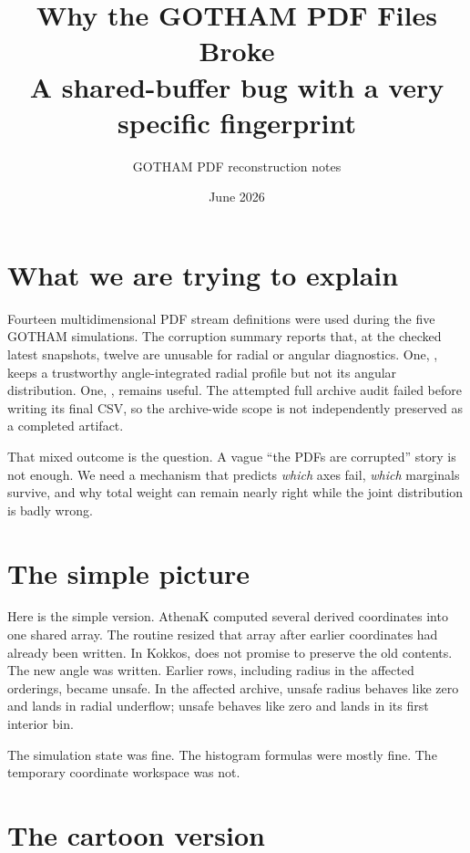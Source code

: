 \documentclass[11pt]{article}
\title{Why the GOTHAM PDF Files Broke\\\large A shared-buffer bug with a very specific fingerprint}
\author{GOTHAM PDF reconstruction notes}
\date{June 2026}
\begin{document}
\maketitle


\section{What we are trying to explain}

Fourteen multidimensional PDF stream definitions were used during the five
GOTHAM simulations. The corruption summary reports that, at the checked latest
snapshots, twelve are unusable for radial or angular diagnostics. One,
, keeps a trustworthy angle-integrated radial profile but
not its angular distribution. One, , remains useful. The
attempted full archive audit failed before writing its final CSV, so the
archive-wide scope is not independently preserved as a completed artifact.

That mixed outcome is the question. A vague ``the PDFs are corrupted'' story
is not enough. We need a mechanism that predicts \emph{which} axes fail,
\emph{which} marginals survive, and why total weight can remain nearly right
while the joint distribution is badly wrong.

\section{The simple picture}

Here is the simple version. AthenaK computed several derived coordinates into
one shared array. The  routine resized that array
after earlier coordinates had already been written. In Kokkos,
 does not promise to preserve the old contents. The new angle
was written. Earlier rows, including radius in the affected orderings, became
unsafe. In the affected archive, unsafe radius behaves like zero and lands in
radial underflow; unsafe  behaves like zero and
lands in its first interior bin.

The simulation state was fine. The histogram formulas were mostly fine. The
temporary coordinate workspace was not.

\section{The cartoon version}
\end{document}
